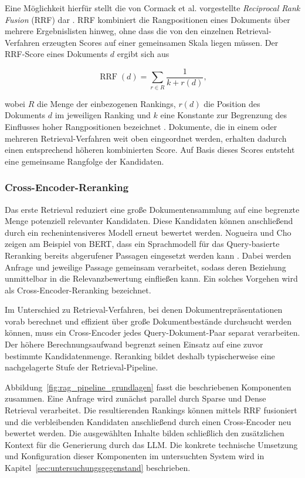 Eine Möglichkeit hierfür stellt die von Cormack et al. vorgestellte \textit{Reciprocal Rank Fusion} (RRF) dar \cite{Cormack2009RRF}. RRF kombiniert die Rangpositionen eines Dokuments über mehrere Ergebnislisten hinweg, ohne dass die von den einzelnen Retrieval-Verfahren erzeugten Scores auf einer gemeinsamen Skala liegen müssen. Der RRF-Score eines Dokuments $d$ ergibt sich aus
 
\begin{equation}
    \operatorname{RRF}(d)
    =
    \sum_{r \in R}
    \frac{1}{k + r(d)},
    \label{eq:rrf}
\end{equation}
 
wobei $R$ die Menge der einbezogenen Rankings, $r(d)$ die Position des Dokuments $d$ im jeweiligen Ranking und $k$ eine Konstante zur Begrenzung des Einflusses hoher Rangpositionen bezeichnet \cite{Cormack2009RRF}. Dokumente, die in einem oder mehreren Retrieval-Verfahren weit oben eingeordnet werden, erhalten dadurch einen entsprechend höheren kombinierten Score. Auf Basis dieses Scores entsteht eine gemeinsame Rangfolge der Kandidaten.
 
\subsubsection{Cross-Encoder-Reranking}
\label{subsubsec:reranking}
 
Das erste Retrieval reduziert eine große Dokumentensammlung auf eine begrenzte Menge potenziell relevanter Kandidaten. Diese Kandidaten können anschließend durch ein rechenintensiveres Modell erneut bewertet werden. Nogueira und Cho zeigen am Beispiel von BERT, dass ein Sprachmodell für das Query-basierte Reranking bereits abgerufener Passagen eingesetzt werden kann \cite{NogueiraCho2019}. Dabei werden Anfrage und jeweilige Passage gemeinsam verarbeitet, sodass deren Beziehung unmittelbar in die Relevanzbewertung einfließen kann. Ein solches Vorgehen wird als Cross-Encoder-Reranking bezeichnet.
 
Im Unterschied zu Retrieval-Verfahren, bei denen Dokumentrepräsentationen vorab berechnet und effizient über große Dokumentbestände durchsucht werden können, muss ein Cross-Encoder jedes Query-Dokument-Paar separat verarbeiten. Der höhere Berechnungsaufwand begrenzt seinen Einsatz auf eine zuvor bestimmte Kandidatenmenge. Reranking bildet deshalb typischerweise eine nachgelagerte Stufe der Retrieval-Pipeline.
 
Abbildung~\ref{fig:rag_pipeline_grundlagen} fasst die beschriebenen Komponenten zusammen. Eine Anfrage wird zunächst parallel durch Sparse und Dense Retrieval verarbeitet. Die resultierenden Rankings können mittels RRF fusioniert und die verbleibenden Kandidaten anschließend durch einen Cross-Encoder neu bewertet werden. Die ausgewählten Inhalte bilden schließlich den zusätzlichen Kontext für die Generierung durch das LLM. Die konkrete technische Umsetzung und Konfiguration dieser Komponenten im untersuchten System wird in Kapitel~\ref{sec:untersuchungsgegenstand} beschrieben.
 
